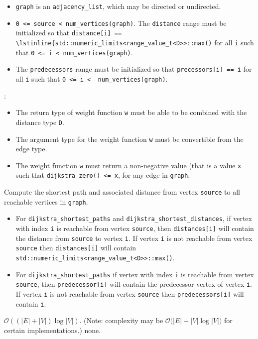 \begin{itemdescr}
\item\preconditions
\begin{itemize}
\item
\lstinline{graph} is an \lstinline{adjacency_list}, which may be directed or
undirected.
\item
\lstinline{0 <= source < num_vertices(graph)}.
\pnum
  The \lstinline{distance} range must be initialized so that 
    \lstinline{distance[i] == \lstinline{std::numeric_limits<range_value_t<D>>::max()} 
    for all \lstinline{i}
    such that \lstinline{0 <= i < num_vertices(graph)}.  
\item
  The \lstinline{predecessors} range must be initialized so that
  \lstinline{precessors[i] == i} for all \lstinline{i} such that 
  \lstinline{0 <= i <  num_vertices(graph)}.
\end{itemize}
\pnum\requires: 
\begin{itemize}
\item
The return type of weight function \lstinline{w} must be able to
  be combined with the distance type \lstinline{D}.  
\item
The argument type for the weight
function \lstinline{w} must be convertible from the edge type.
\item
  The weight function \lstinline{w} must return a non-negative value (that is
  a value \lstinline{x} such that \lstinline{dijkstra_zero() <= x},
  for any edge in \lstinline{graph}.
\end{itemize}
\pnum\effects
 Compute the shortest path and associated distance from vertex
\lstinline{source} to all reachable vertices in \lstinline{graph}.
\pnum\returns
\begin{itemize}
\item
For \lstinline{dijkstra_shortest_paths} and \lstinline{dijkstra_shortest_distances},
  if vertex with index \lstinline{i} is reachable from vertex \lstinline{source}, then
  \lstinline{distances[i]} will contain the distance from \lstinline{source} to vertex
  \lstinline{i}.  If vertex \lstinline{i} is not reachable from vertex
  \lstinline{source} then \lstinline{distances[i]} will contain
  \lstinline{std::numeric_limits<range_value_t<D>>::max()}.
\item
For \lstinline{dijkstra_shortest_paths} if vertex with index \lstinline{i} is reachable
from vertex \lstinline{source}, then \lstinline{predecessor[i]} will contain the
predecessor vertex of vertex \lstinline{i}.  If vertex \lstinline{i} is not reachable
from vertex \lstinline{source} then \lstinline{predecessors[i]} will contain
\lstinline{i}.
\end{itemize}
%
\pnum\complexity $\mathcal{O}((|E| + |V|)\log{|V|})$.  (Note: complexity may be
$\mathcal{O}(|E| + |V|\log{|V|)}$ for certain implementations.)
\pnum\throws none. 
\end{itemdescr}



